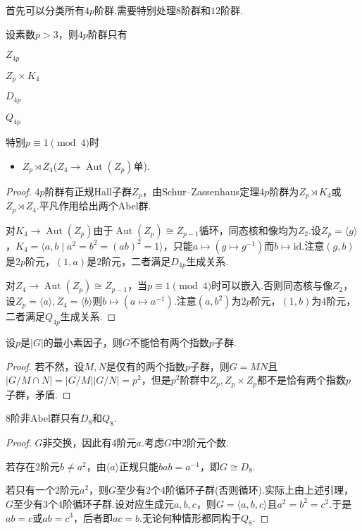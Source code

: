 首先可以分类所有$4p$阶群.需要特别处理$8$阶群和$12$阶群.
\begin{prop}
	设素数$p>3$，则$4p$阶群只有\par
	\begin{itemize*}
		\item $Z_{4p}$\phantom{\qquad}
		\item $Z_p\times K_4$\phantom{\qquad}
		\item $D_{4p}$\phantom{\qquad}
		\item $Q_{4p}$
	\end{itemize*}\par
	特别$p\equiv 1\pmod 4$时
	\begin{itemize}
		\item $Z_p\rtimes Z_4$\quad($Z_4\to\operatorname*{Aut}(Z_p)$单).
	\end{itemize}\hypertarget{prop:4pGroupStruc}{}
\end{prop}
\begin{proof}
	$4p$阶群有正规Hall子群$Z_p$，由Schur--Zassenhaus定理$4p$阶群为$Z_p\rtimes K_4$或$Z_p\rtimes Z_4$.平凡作用给出两个Abel群.

	对$K_4\to\operatorname*{Aut}(Z_p)$由于$\operatorname*{Aut}(Z_p)\cong Z_{p-1}$循环，同态核和像均为$Z_2$.设$Z_p=\langle g\rangle $，$K_4=\langle a,b\mid a^2=b^2=(ab)^2=1\rangle $，只能$a\mapsto(g\mapsto g^{-1})$而$b\mapsto\mathrm{id}$.注意$(g,b)$是$2p$阶元，$(1,a)$是$2$阶元，二者满足$D_{4p}$生成关系.

	对$Z_4\to\operatorname*{Aut}(Z_p)\cong Z_{p-1}$，当$p\equiv 1\pmod 4$时可以嵌入.否则同态核与像$Z_2$，设$Z_p=\langle a\rangle ,Z_4=\langle b\rangle $则$b\mapsto(a\mapsto a^{-1})$.注意$(a,b^2)$为$2p$阶元，$(1,b)$为$4$阶元，二者满足$Q_{4p}$生成关系.
\end{proof}
\begin{lemma}
	设$p$是$|G|$的最小素因子，则$G$不能恰有两个指数$p$子群.
\end{lemma}
\begin{proof}
	若不然，设$M,N$是仅有的两个指数$p$子群，则$G=MN$且$|G/M\cap N|=|G/M||G/N|=p^2$，但是$p^2$阶群中$Z_p,Z_p\times Z_p$都不是恰有两个指数$p$子群，矛盾.
\end{proof}
\begin{prop}
	$8$阶非Abel群只有$D_8$和$Q_8$.
\end{prop}
\begin{proof}
	$G$非交换，因此有$4$阶元$a$.考虑$G$中$2$阶元个数.
	
	若存在$2$阶元$b\ne a^2$，由$\langle a\rangle $正规只能$bab=a^{-1}$，即$G\cong D_8$.
	
	若只有一个$2$阶元$a^2$，则$G$至少有$2$个$4$阶循环子群(否则循环).实际上由上述引理，$G$至少有$3$个$4$阶循环子群.设对应生成元$a,b,c$，则$G=\langle a,b,c\rangle $且$a^2=b^2=c^2$.于是$ab=c$或$ab=c^3$，后者即$ac=b$.无论何种情形都同构于$Q_8$.
\end{proof}
